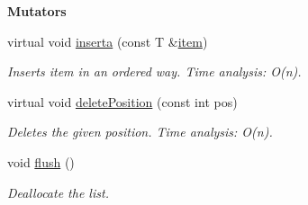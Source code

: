 \begin{Indent}{\bf Mutators}\par
\begin{DoxyCompactItemize}
\item 
virtual void \hyperlink{classedi_1_1LinkedList_abcf6acdcd3d791ddaf9d49b8a96a6c05}{inserta} (const T \&\hyperlink{classedi_1_1LinkedList_a9b964bff1d09e65a96150e8fe4317912}{item})
\begin{DoxyCompactList}\small\item\em Inserts item in an ordered way. Time analysis\+: O(n). \end{DoxyCompactList}\item 
virtual void \hyperlink{classedi_1_1LinkedList_a5bf790b49f73467d0364656be3a2e2d6}{delete\+Position} (const int pos)
\begin{DoxyCompactList}\small\item\em Deletes the given position. Time analysis\+: O(n). \end{DoxyCompactList}\item 
\hypertarget{classedi_1_1LinkedList_a828383be65e87009a938fe79b093214c}{void \hyperlink{classedi_1_1LinkedList_a828383be65e87009a938fe79b093214c}{flush} ()}\label{classedi_1_1LinkedList_a828383be65e87009a938fe79b093214c}

\begin{DoxyCompactList}\small\item\em Deallocate the list. \end{DoxyCompactList}\end{DoxyCompactItemize}
\end{Indent}
